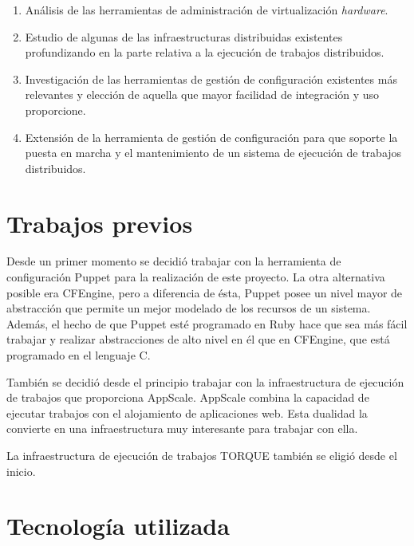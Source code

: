 \begin{enumerate}
\item Análisis de las herramientas de administración de virtualización \emph{hardware}.
\item Estudio de algunas de las infraestructuras distribuidas existentes profundizando en la parte relativa a la ejecución de trabajos distribuidos.
\item Investigación de las herramientas de gestión de configuración existentes más relevantes y elección de aquella que mayor facilidad de integración y uso proporcione.
\item Extensión de la herramienta de gestión de configuración para que soporte la puesta en marcha y el mantenimiento de un sistema de ejecución de trabajos distribuidos.
\end{enumerate}


\section{Trabajos previos}

Desde un primer momento se decidió trabajar con la herramienta de configuración Puppet para la realización de este proyecto. La otra alternativa posible era CFEngine, pero a diferencia de ésta, Puppet posee un nivel mayor de abstracción que permite un mejor modelado de los recursos de un sistema. Además, el hecho de que Puppet esté programado en Ruby hace que sea más fácil trabajar y realizar abstracciones de alto nivel en él que en CFEngine, que está programado en el lenguaje C.

También se decidió desde el principio trabajar con la infraestructura de ejecución de trabajos que proporciona AppScale. AppScale combina la capacidad de ejecutar trabajos con el alojamiento de aplicaciones web. Esta dualidad la convierte en una infraestructura muy interesante para trabajar con ella.

La infraestructura de ejecución de trabajos TORQUE también se eligió desde el inicio.


\section{Tecnología utilizada}

